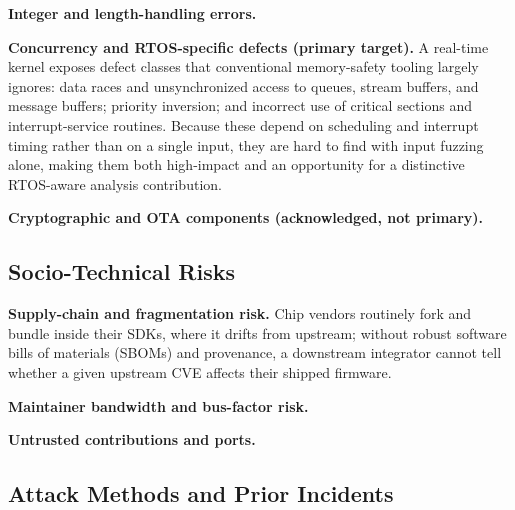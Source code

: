 \noindent\textbf{Integer and length-handling errors.}

\noindent\textbf{Concurrency and RTOS-specific defects (primary target).}
A real-time kernel exposes defect classes that conventional memory-safety tooling largely ignores: data races and unsynchronized access to queues, stream buffers, and message buffers; priority inversion; and incorrect use of critical sections and interrupt-service routines.
Because these depend on scheduling and interrupt timing rather than on a single input, they are hard to find with input fuzzing alone, making them both high-impact and an opportunity for a distinctive RTOS-aware analysis contribution.

\noindent\textbf{Cryptographic and OTA components (acknowledged, not primary).}

\subsection{Socio-Technical Risks}

\noindent\textbf{Supply-chain and fragmentation risk.}
Chip vendors routinely fork and bundle \ose{} inside their SDKs, where it drifts from upstream; without robust software bills of materials (SBOMs) and provenance, a downstream integrator cannot tell whether a given upstream CVE affects their shipped firmware.

\noindent\textbf{Maintainer bandwidth and bus-factor risk.}

\noindent\textbf{Untrusted contributions and ports.}

\subsection{Attack Methods and Prior Incidents}

